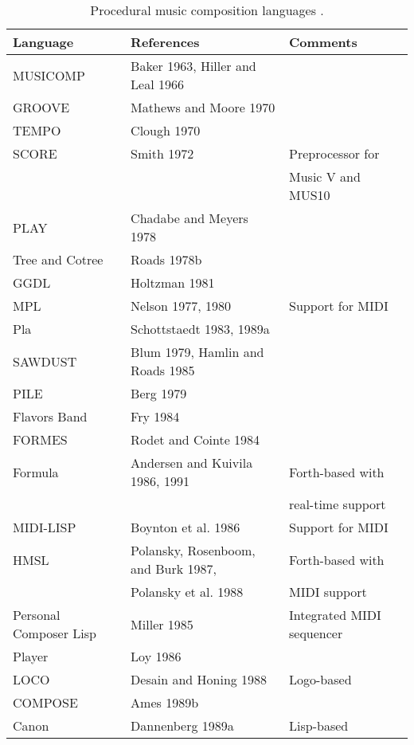 
\begin{table}[htbp]
	\caption{Procedural music composition languages \cite[815-817]{Roads1995}.}
	\centering
	\vspace{12pt}
	\begin{tabular}{ *{3}{l} }
		\hline
		Language & References & Comments \\
		\hline
		MUSICOMP & Baker 1963, Hiller and Leal 1966 & \\
		GROOVE & Mathews and Moore 1970 & \\
		TEMPO & Clough 1970 & \\
		SCORE & Smith 1972 & Preprocessor for \\
		&& Music V and MUS10 \\
		PLAY & Chadabe and Meyers 1978 & \\
		Tree and Cotree & Roads 1978b & \\
		GGDL & Holtzman 1981 & \\
		MPL & Nelson 1977, 1980 & Support for MIDI \\
		Pla & Schottstaedt 1983, 1989a & \\
		SAWDUST & Blum 1979, Hamlin and Roads 1985 & \\
		PILE & Berg 1979 & \\
		Flavors Band & Fry 1984 & \\
		FORMES & Rodet and Cointe 1984 & \\
		Formula & Andersen and Kuivila 1986, 1991 & Forth-based with \\
		&& real-time support \\
		MIDI­-LISP & Boynton et al. 1986 & Support for MIDI \\
		HMSL & Polansky, Rosenboom, and Burk 1987, & Forth-based with \\
		& Polansky et al. 1988 & MIDI support \\
		Personal Composer Lisp & Miller 1985 & Integrated MIDI sequencer \\
		Player & Loy 1986 & \\
		LOCO & Desain and Honing 1988 & Logo-based \\
		COMPOSE & Ames 1989b & \\
		Canon & Dannenberg 1989a & Lisp-based \\

\end{tabular}
\end{table}

